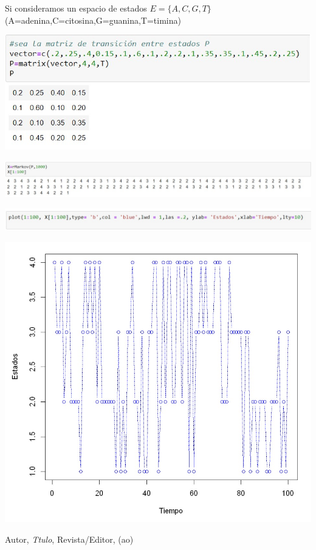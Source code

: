 \documentclass[10pt,a4paper]{article}
\theoremstyle{definition}
\theoremstyle{remark}
\newenvironment{Figure}
  {\par\medskip\noindent\minipage{\linewidth}}
  {\endminipage\par\medskip}
\begin{document}
\begin{multicols}{2}
Si consideramos un espacio de estados $E=\{A,C,G,T\}$ (A=adenina,C=citosina,G=guanina,T=timina)

\begin{Figure}
	\centering
	\includegraphics[scale=0.26]{fun2.jpeg}
	\label{figura2}
\end{Figure}

\begin{Figure}
	\centering
	\includegraphics[scale=0.20]{fun3.jpeg}
	\label{figura3}
\end{Figure}

\begin{Figure}
	\centering
	\includegraphics[scale=0.25]{fun4.jpeg}
	\label{figura4}
\end{Figure}

\begin{Figure}
	\centering
	\includegraphics[scale=0.2]{fun5.jpeg}
	\label{figura5}
\end{Figure}

\end{multicols}
\begin{thebibliography}{99}

 Autor, \emph{Ttulo}, Revista/Editor, (ao)

\end{thebibliography}
\end{document}
